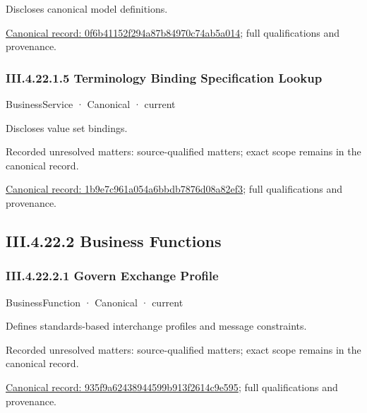 Discloses canonical model definitions.


{\footnotesize \href{../../../../continuum/business/business-service/0f6b41152f294a87b84970c74ab5a014.md}{Canonical record: 0f6b41152f294a87b84970c74ab5a014}; full qualifications and provenance.}\par
\subsubsection*{III.4.22.1.5 Terminology Binding Specification Lookup}
\label{navigation:III.4.22.1.5}

\label{element:1b9e7c961a054a6bbdb7876d08a82ef3}
{\small BusinessService · Canonical · current}\par

Discloses value set bindings.


{\small Recorded unresolved matters: source-qualified matters; exact scope remains in the canonical record.}\par
{\footnotesize \href{../../../../continuum/business/business-service/1b9e7c961a054a6bbdb7876d08a82ef3.md}{Canonical record: 1b9e7c961a054a6bbdb7876d08a82ef3}; full qualifications and provenance.}\par
\subsection*{III.4.22.2 Business Functions}
\label{navigation:III.4.22.2}

\subsubsection*{III.4.22.2.1 Govern Exchange Profile}
\label{navigation:III.4.22.2.1}

\label{element:935f9a62438944599b913f2614c9e595}
{\small BusinessFunction · Canonical · current}\par

Defines standards-based interchange profiles and message constraints.


{\small Recorded unresolved matters: source-qualified matters; exact scope remains in the canonical record.}\par
{\footnotesize \href{../../../../continuum/business/business-function/935f9a62438944599b913f2614c9e595.md}{Canonical record: 935f9a62438944599b913f2614c9e595}; full qualifications and provenance.}\par
